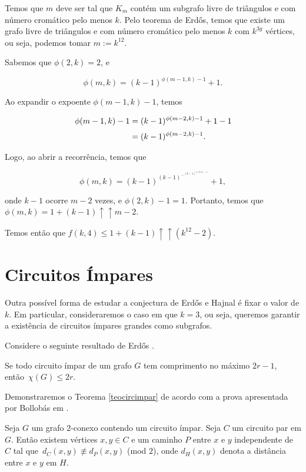 Temos que $m$ deve ser tal que $K_m$ contém um subgrafo livre de triângulos e com número cromático pelo menos $k$. Pelo teorema de Erd\H{o}s, temos que existe um grafo livre de triângulos e com número cromático pelo menos $k$ com $k^{3g}$ vértices, ou seja, podemos tomar $m := k^{12}$.

Sabemos que $\phi(2,k) = 2$, e

\[\phi(m,k) = (k-1)^{\phi(m-1,k)-1}+1.\]

Ao expandir o expoente $\phi(m-1,k)-1$, temos

\begin{equation*}
\setlength{\jot}{5pt}
\begin{aligned}
\phi(m-1,k)-1 &= (k-1)^{\phi(m-2,k)-1}+1-1 \\
&= (k-1)^{\phi(m-2,k)-1}.
\end{aligned}
\end{equation*}

Logo, ao abrir a recorrência, temos que 

\[\phi(m,k) = (k-1)^{(k-1)^{\cdots^{(k-1)^{\phi(2,k)-1}}}}+1,\]

onde $k-1$ ocorre $m-2$ vezes, e $\phi(2,k)-1 = 1$. Portanto, temos que $\phi(m,k) = 1+(k-1)\uparrow\uparrow m-2$.

Temos então que $f(k,4) \leq 1+ (k-1) \uparrow\uparrow (k^{12}-2)$.

\section{Circuitos Ímpares}

Outra possível forma de estudar a conjectura de Erd\H{o}s e Hajnal é fixar o valor de $k$. Em particular, consideraremos o caso em que $k=3$, ou seja, queremos garantir a existência de circuitos ímpares grandes como subgrafos.

Considere o seguinte resultado de Erd\H{o}s \cite{erdHos1966chromatic}.

\begin{teorema}\label{teocircimpar}
Se todo circuito ímpar de um grafo $G$ tem comprimento no máximo $2r-1$, então~$\chi(G) \leq 2r$.
\end{teorema}

Demonstraremos o Teorema \ref{teocircimpar} de acordo com a prova apresentada por Bollobás em \cite{bollobas2004extremal}.

\begin{lema}\label{lemacircimpar}
Seja $G$ um grafo $2$-conexo contendo um circuito ímpar. Seja $C$ um circuito par em $G$. Então existem vértices $x,y \in C$ e um caminho $P$ entre $x$ e $y$ independente de $C$ tal que~$d_C(x,y) \not\equiv d_P(x,y)$ (mod $2$), onde $d_H(x,y)$ denota a distância entre $x$ e $y$ em $H$.
\end{lema}

